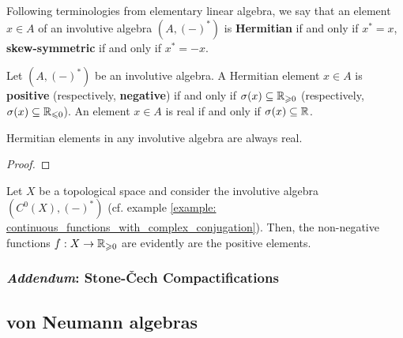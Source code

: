             \begin{definition} \label{def: hermitian_and_skew_symmetric_elements}
                Following terminologies from elementary linear algebra, we say that an element $x \in A$ of an involutive algebra $(A, (-)^*)$ is \textbf{Hermitian} if and only if $x^* = x$,  \textbf{skew-symmetric} if and only if $x^* = -x$.
            \end{definition}
            \begin{definition} \label{def: positivity_and_negativity}
                Let $(A, (-)^*)$ be an involutive algebra. A Hermitian element $x \in A$ is \textbf{positive} (respectively, \textbf{negative}) if and only if $\sigma(x) \subseteq \mathbb{R}_{\geqslant 0}$ (respectively, $\sigma(x) \subseteq \mathbb{R}_{\leqslant 0}$). An element $x \in A$ is real if and only if $\sigma(x) \subseteq \mathbb{R}$.
            \end{definition}
            \begin{proposition} \label{prop: hermitian_elements_are_real}
                Hermitian elements in any involutive algebra are always real.
            \end{proposition}
                \begin{proof}
                    
                \end{proof}
            \begin{example}
                Let $X$ be a topological space and consider the involutive algebra $(C^0(X), (-)^*)$ (cf. example \ref{example: continuous_functions_with_complex_conjugation}). Then, the non-negative functions $f: X \to \mathbb{R}_{\geqslant 0}$ are evidently are the positive elements.
            \end{example}
                
        \subsubsection{\textit{Addendum}: Stone-\v{C}ech Compactifications}
    
    \subsection{von Neumann algebras}